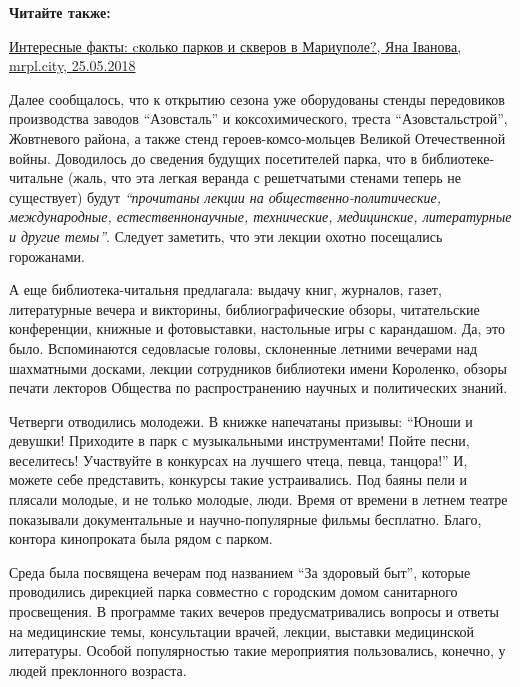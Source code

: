 \textbf{Читайте также:} 

\href{https://mrpl.city/news/view/interesnye-fakty-skolko-parkov-i-skverov-v-mariupole-foto}{%
Интересные факты: cколько парков и скверов в Мариуполе?, Яна Іванова, mrpl.city, 25.05.2018}


Далее сообщалось, что к открытию сезона уже оборудованы стенды передовиков
производства заводов \enquote{Азовсталь} и коксохимического, треста \enquote{Азовстальстрой},
Жовтневого района, а также стенд героев-комсо\hyp{}мольцев Великой Отечественной
войны. Доводилось до сведения будущих посетителей парка, что в
библиотеке-читальне (жаль, что эта легкая веранда с решетчатыми стенами теперь
не существует) будут \emph{\enquote{прочитаны лекции на общественно-политические,
международные, естественнонаучные, технические, медицинские, литературные и
другие темы}}. Следует заметить, что эти лекции охотно посещались горожанами.


А еще библиотека-читальня предлагала: выдачу книг, журналов, газет,
литературные вечера и викторины, библиографические обзоры, читательские
конференции, книжные и фотовыставки, настольные игры с карандашом. Да, это
было. Вспоминаются седовласые головы, склоненные летними вечерами над
шахматными досками, лекции сотрудников библиотеки имени Короленко, обзоры
печати лекторов Общества по распространению научных и политических знаний.

Четверги отводились молодежи. В книжке напечатаны призывы: \enquote{Юноши и девушки!
Приходите в парк с музыкальными инструментами! Пойте песни, веселитесь!
Участвуйте в конкурсах на лучшего чтеца, певца, танцора!} И, можете себе
представить, конкурсы такие устраивались. Под баяны пели и плясали молодые, и
не только молодые, люди. Время от времени в летнем театре показывали
документальные и научно-популярные фильмы бесплатно. Благо, контора кинопроката
была рядом с парком.

Среда была посвящена вечерам под названием \enquote{За здоровый быт}, которые
проводились дирекцией парка совместно с городским домом санитарного
просвещения. В программе таких вечеров предусматривались вопросы и ответы на
медицинские темы, консультации врачей, лекции, выставки медицинской литературы.
Особой популярностью такие мероприятия пользовались, конечно, у людей
преклонного возраста.

